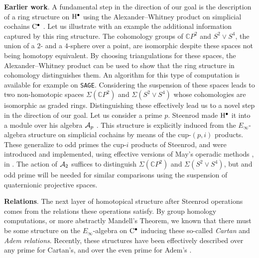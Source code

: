 \medskip\noindent\textbf{Earlier work}.
A fundamental step in the direction of our goal is the description of a ring structure on $\mathrm{H}^\bullet$ using the Alexander--Whitney product on simplicial cochains $\mathrm{C}^\bullet$ \cite{alexander1936ring, whitney1938products}.
Let us illustrate with an example the additional information captured by this ring structure.
The cohomology groups of $\mathbb{C} P^2$ and $S^2 \vee S^4$, the union of a $2$- and a $4$-sphere over a point, are isomorphic despite these spaces not being homotopy equivalent.
By choosing triangulations for these spaces, the Alexander--Whitney product can be used to show that the ring structure in cohomology distinguishes them.
An algorithm for this type of computation is available for example on \texttt{SAGE}.
Considering the suspension of these spaces leads to two non-homotopic spaces $\Sigma(\mathbb{C} P^2)$ and $\Sigma(S^2 \vee S^4)$ whose cohomologies are isomorphic as graded rings.
Distinguishing these effectively lead us to a novel step in the direction of our goal.
Let us consider a prime $p$.
Steenrod made $\mathrm{H}^\bullet$ it into a module over his algebra $\mathcal{A}_p$ \cite{steenrod1962cohomology}.
This structure is explicitly induced from the $E_\infty$-algebra structure on simplicial cochains by means of the cup-$(p,i)$ products.
These generalize to odd primes the cup-$i$ products of Steenrod, and were introduced and implemented, using effective versions of May's operadic methods \cite{may1970general}, in \cite{medina2021may_st,medina2021comch}.
The action of $\mathcal{A}_2$ suffices to distinguish $\Sigma(\mathbb{C} P^2)$ and $\Sigma(S^2 \vee S^4)$, but and odd prime will be needed for similar comparisons using the suspension of quaternionic projective spaces.


\medskip\noindent\textbf{{\sc Relations}}.
The next layer of homotopical structure after Steenrod operations comes from the relations these operations satisfy.
By group homology computations, or more abstractly Mandell's Theorem, we known that there must be some structure on the $E_\infty$-algebra on $\mathrm{C}^\bullet$ inducing these so-called \textit{Cartan} and \textit{Adem relations}.
Recently, these structures have been effectively described over any prime for Cartan's, and over the even prime for Adem's \cite{medina2020cartan,medina2023oddcartan,medina2021adem}.

